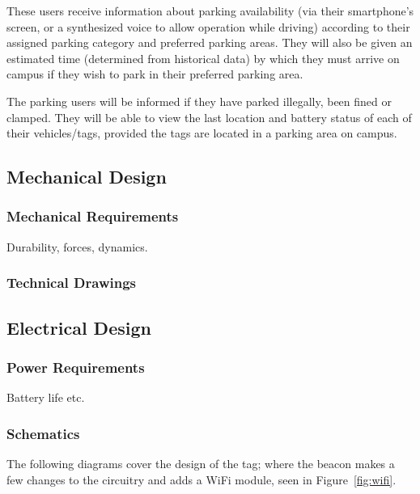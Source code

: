 These users receive information about parking availability (via their smartphone's screen, or a synthesized voice to allow operation while driving) according to their assigned parking category and preferred parking areas. They will also be given an estimated time (determined from historical data) by which they must arrive on campus if they wish to park in their preferred parking area.

The parking users will be informed if they have parked illegally, been fined or clamped. They will be able to view the last location and battery status of each of their vehicles/tags, provided the tags are located in a parking area on campus.

\newpage
\subsection{Mechanical Design} 
\subsubsection{Mechanical Requirements}
Durability, forces, dynamics.
\subsubsection{Technical Drawings}
\subsection{Electrical Design} 
\subsubsection{Power Requirements}
Battery life etc.

\newpage
\subsubsection{Schematics}

The following diagrams cover the design of the tag; where the beacon makes a few changes to the circuitry and adds a WiFi module, seen in Figure~\ref{fig:wifi}.

